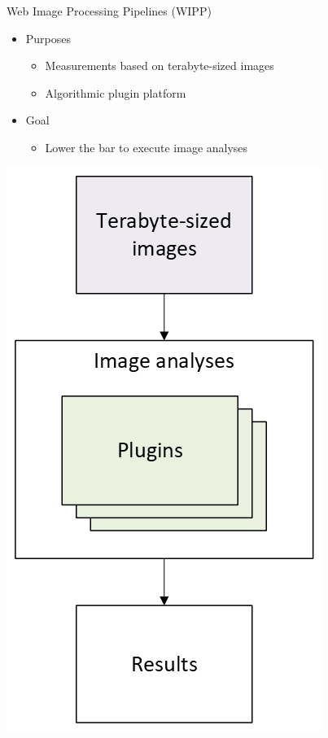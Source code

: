 \begin{frame}
\begin{minipage}[h!]{0.60\textwidth}
    Web Image Processing Pipelines (WIPP)
    \begin{itemize}
      \item Purposes
      \begin{itemize}
        \item Measurements based on terabyte-sized images
        \item Algorithmic plugin platform
      \end{itemize}
      \item Goal
      \begin{itemize}
        \item Lower the bar to execute image analyses
      \end{itemize}
    \end{itemize}
  \end{minipage}\hfill
  \begin{minipage}[h!]{0.35\textwidth}
    \includegraphics[scale=0.55]{./img/1_background/wipp.png}
  \end{minipage}
\end{frame}

